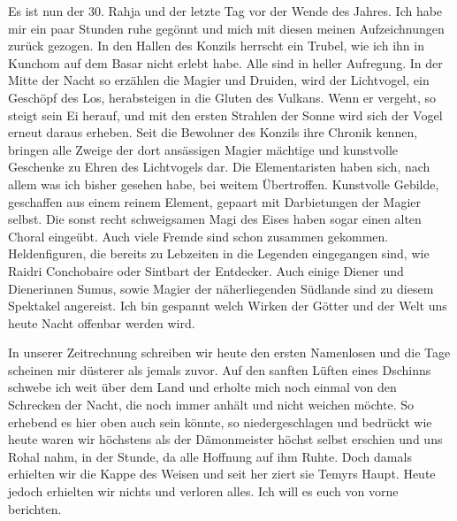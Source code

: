 Es ist nun der 30. Rahja und der letzte Tag vor der Wende des Jahres. Ich habe mir ein paar Stunden ruhe gegönnt und mich mit diesen meinen Aufzeichnungen zurück gezogen. In den Hallen des Konzils herrscht ein Trubel, wie ich ihn in Kunchom auf dem Basar nicht erlebt habe. Alle sind in heller Aufregung. In der Mitte der Nacht so erzählen die Magier und Druiden, wird der Lichtvogel, ein Geschöpf des Los, herabsteigen in die Gluten des Vulkans. Wenn er vergeht, so steigt sein Ei herauf, und mit den ersten Strahlen der Sonne wird sich der Vogel erneut daraus erheben. Seit die Bewohner des Konzils ihre Chronik kennen, bringen alle Zweige der dort ansässigen Magier mächtige und kunstvolle Geschenke zu Ehren des Lichtvogels dar. Die Elementaristen haben sich, nach allem was ich bisher gesehen habe, bei weitem Übertroffen. Kunstvolle Gebilde, geschaffen aus einem reinem Element, gepaart mit Darbietungen der Magier selbst. Die sonst recht schweigsamen Magi des Eises haben sogar einen alten Choral eingeübt. Auch viele Fremde sind schon zusammen gekommen. Heldenfiguren, die bereits zu Lebzeiten in die Legenden eingegangen sind, wie Raidri Conchobaire oder Sintbart der Entdecker. Auch einige Diener und Dienerinnen Sumus, sowie Magier der näherliegenden Südlande sind zu diesem Spektakel angereist. Ich bin gespannt welch Wirken der Götter und der Welt uns heute Nacht offenbar werden wird.


In unserer Zeitrechnung schreiben wir heute den ersten Namenlosen und die Tage scheinen mir düsterer als jemals zuvor. Auf den sanften Lüften eines Dschinns schwebe ich weit über dem Land und erholte mich noch einmal von den Schrecken der Nacht, die noch immer anhält und nicht weichen möchte. So erhebend es hier oben auch sein könnte, so niedergeschlagen und bedrückt wie heute waren wir höchstens als der Dämonmeister höchst selbst erschien und uns Rohal nahm, in der Stunde, da alle Hoffnung auf ihm Ruhte. Doch damals erhielten wir die Kappe des Weisen und seit her ziert sie Temyrs Haupt. Heute jedoch erhielten wir nichts und verloren alles. Ich will es euch von vorne berichten.

